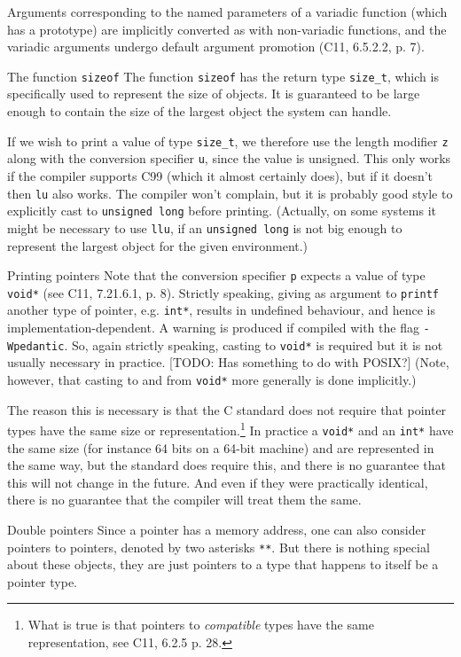 \documentclass[article, a4paper, 11pt, oneside]{memoir}
\numberwithin{equation}{chapter}
\newcommand{\inlinecode}[1]{\colorbox{lightgray}{\vphantom{\texttt{jk}}\lstinline$#1$}}
\renewcommand{\inlinecode}{\lstinline}
\begin{document}
\begin{notelist}
Arguments corresponding to the named parameters of a variadic function (which has a prototype) are implicitly converted as with non-variadic functions, and the variadic arguments undergo default argument promotion (C11, 6.5.2.2, p. 7).

\item[The function \texttt{sizeof}]
The function \inlinecode{sizeof} has the return type \inlinecode{size_t}, which is specifically used to represent the size of objects. It is guaranteed to be large enough to contain the size of the largest object the system can handle.

If we wish to print a value of type \inlinecode{size_t}, we therefore use the length modifier \inlinecode{z} along with the conversion specifier \inlinecode{u}, since the value is unsigned. This only works if the compiler supports C99 (which it almost certainly does), but if it doesn't then \inlinecode{lu} also works. The compiler won't complain, but it is probably good style to explicitly cast to \inlinecode{unsigned long} before printing. (Actually, on some systems it might be necessary to use \inlinecode{llu}, if an \inlinecode{unsigned long} is not big enough to represent the largest object for the given environment.)

\item[Printing pointers]
Note that the conversion specifier \inlinecode{p} expects a value of type \inlinecode{void*} (see C11, 7.21.6.1, p. 8). Strictly speaking, giving as argument to \inlinecode{printf} another type of pointer, e.g. \inlinecode{int*}, results in undefined behaviour, and hence is implementation-dependent. A warning is produced if compiled with the flag \inlinecode{-Wpedantic}. So, again strictly speaking, casting to \inlinecode{void*} is required but it is not usually necessary in practice. [TODO: Has something to do with POSIX?] (Note, however, that casting to and from \inlinecode{void*} more generally is done implicitly.)

The reason this is necessary is that the C standard does not require that pointer types have the same size or representation.\footnote{What is true is that pointers to \emph{compatible} types have the same representation, see C11, 6.2.5 p. 28.} In practice a \inlinecode{void*} and an \inlinecode{int*} have the same size (for instance 64 bits on a 64-bit machine) and are represented in the same way, but the standard does require this, and there is no guarantee that this will not change in the future. And even if they were practically identical, there is no guarantee that the compiler will treat them the same.

\item[Double pointers]
Since a pointer has a memory address, one can also consider pointers to pointers, denoted by two asterisks \inlinecode{**}. But there is nothing special about these objects, they are just pointers to a type that happens to itself be a pointer type.
\end{notelist}
\end{document}
